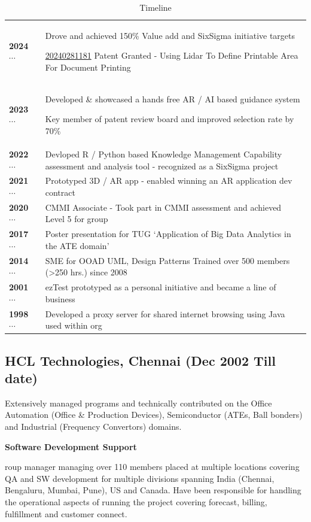 \documentclass[a4paper,12pt]{article}
\newcommand\cvte[2]{\footnotesize{\textbf{#1}} ~$\cdots$~ & \footnotesize{#2}}
\newcommand\cvsubsection[3]{\subsection*{#1 \quad \small{(#2 \textendash #3)}}}
\newcommand\cvprojectentry[5]{
  \bf{#1}
  
  \normalfont{\it{Domain: #2}\normalfont{} \quad (#3 \textendash #4)}
  
}
\begin{document}
{
\begin{table}
  \caption*{Timeline}
  \begin{tabular}{l|p{4cm}}
    \hline
    \cvte{2024}{Drove and achieved 150\% Value add and SixSigma initiative targets} \par \href{https://patents.justia.com/patent/20240281181}{20240281181} Patent Granted - Using Lidar To Define Printable Area For Document Printing \\
    \cvte{2023}{Developed \& showcased a hands free AR / AI based guidance system \par Key member of patent review board and improved selection rate by 70\% } \\
    \cvte{2022}{Devloped R / Python based  Knowledge Management Capability assessment and analysis tool - recognized as a SixSigma project} \\
    \cvte{2021}{Prototyped 3D / AR app - enabled winning an AR application dev contract} \\
    \cvte{2020}{CMMI Associate - Took part in CMMI assessment and achieved Level 5 for group} \\
    \cvte{2017}{Poster presentation for TUG \textendash `Application of Big Data Analytics in the ATE domain'} \\
    \cvte{2014}{SME for OOAD UML, Design Patterns \textendash Trained over 500 members (>250 hrs.) since 2008} \\
    \cvte{2001}{ezTest prototyped as a personal initiative and became a line of business} \\
    \cvte{1998}{Developed a proxy server for shared internet browsing using Java used within org} \\
    \hline
  \end{tabular}
\end{table}

\cvsubsection{HCL Technologies, Chennai}{Dec 2002}{Till date}

Extensively managed programs and technically contributed on the Office
Automation (Office \& Production Devices), Semiconductor (ATEs, Ball
bonders) and Industrial (Frequency Convertors) domains.

\cvprojectentry{Software Development Support}{Semiconductors}{Jan 2024}{Till date}

Group manager managing over 110 members placed at multiple locations
covering QA and SW development for multiple divisions spanning India
(Chennai, Bengaluru, Mumbai, Pune), US and Canada. Have been responsible for
handling the operational aspects of running the project covering
forecast, billing, fulfillment and customer connect.

}
\end{document}
